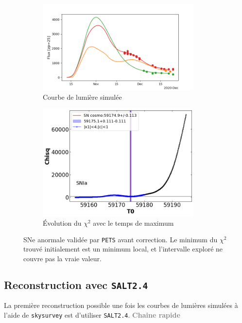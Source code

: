 \documentclass{book}
\newcommand{\todo}[1]{{\textcolor{gray}{\bf \large #1}}}
\def\skysurvey{\texttt{skysurvey}\xspace}
\def\pets{\texttt{PETS}\xspace}
\def\saltd{\texttt{SALT2.4}\xspace}
\begin{document}
\begin{figure}
	\begin{subfigure}{0.45\textwidth}
		\centering
		\includegraphics[width=0.9\textwidth]{figures/544_lc_truth.png}
		\caption{Courbe de lumière simulée}
	\end{subfigure}
	\hfill
	\begin{subfigure}{0.45\textwidth}
		\centering
		\includegraphics[width=0.9\textwidth]{figures/544_Tmaxgrid.png}
		\caption{Évolution du $\chi^2$ avec le temps de maximum}
	\end{subfigure}
	\caption{SNe anormale validée par \pets avant correction. Le minimum du $\chi^2$ trouvé initialement est un minimum local, et l'intervalle exploré ne couvre pas la vraie valeur. }
	\label{fig:pets_worst}
\end{figure}

\subsection{Reconstruction avec \saltd}

La première reconstruction possible une fois les courbes de lumières simulées à l'aide de \skysurvey est d'utiliser \saltd.
\todo{Chaine rapide}
\end{document}
